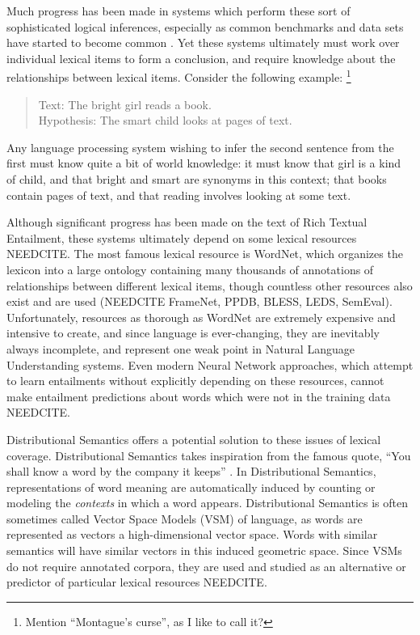 \documentclass[letterpaper]{article}
\begin{document}
Much progress has been made in systems which perform these sort of sophisticated
logical inferences, especially as common benchmarks and data sets have started
to become common \cite{marelli:2014:semeval,bowman:2015:emnlp,NEEDCITE}. Yet these
systems ultimately must work over individual lexical items to form a
conclusion, and require knowledge about the relationships between lexical
items. Consider the following example:
\footnote{Mention ``Montague's curse'', as I like to call it?}
\begin{quote}
  Text: The bright girl reads a book.\\
  Hypothesis: The smart child looks at pages of text.
\end{quote}
Any language processing system wishing to infer the second sentence from
the first must know quite a bit of world knowledge: it must know that
girl is a kind of child, and that bright and smart are synonyms in this
context; that books contain pages of text, and that reading involves looking
at some text.

Although significant progress has been made on the text of
Rich Textual Entailment, these systems ultimately depend on some lexical
resources NEEDCITE. The most famous lexical resource is WordNet, which
organizes the lexicon into a large ontology containing many thousands of
annotations of relationships between different lexical items, though countless
other resources also exist and are used (NEEDCITE FrameNet, PPDB, BLESS, LEDS,
SemEval). Unfortunately, resources as thorough as WordNet are extremely
expensive and intensive to create, and since language is ever-changing, they
are inevitably always incomplete, and represent one weak point in Natural
Language Understanding systems. Even modern Neural Network approaches,
which attempt to learn entailments without explicitly depending on these
resources, cannot make entailment predictions about words which were not
in the training data NEEDCITE.

Distributional Semantics offers a potential solution to these issues of lexical
coverage. Distributional Semantics takes inspiration from the famous quote,
``You shall know a word by the company it keeps'' \cite{firth:1957:la}. In
Distributional Semantics, representations of word meaning are automatically
induced by counting or modeling the {\em contexts} in which a word appears.
Distributional Semantics is often sometimes called Vector Space Models (VSM) of
language, as words are represented as vectors a high-dimensional vector space.
Words with similar semantics will have similar vectors in this induced
geometric space. Since VSMs do not require annotated corpora, they are used and
studied as an alternative or predictor of particular lexical resources NEEDCITE.
\end{document}
